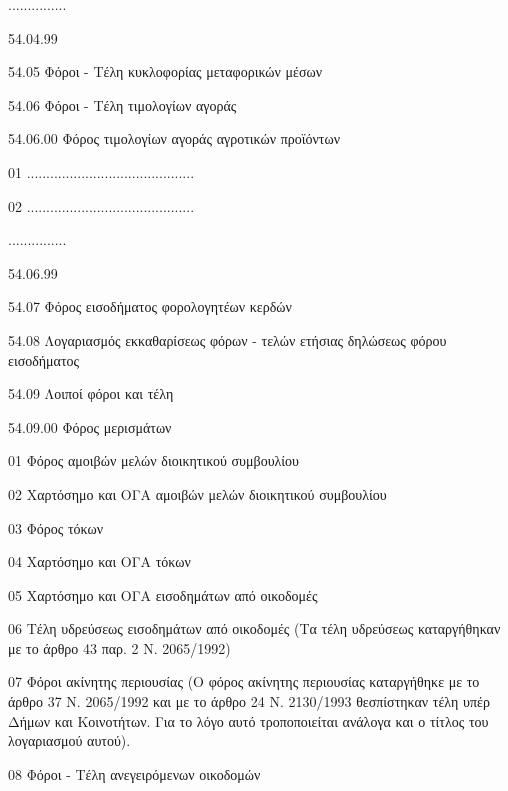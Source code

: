 \documentclass[A4,10pt,greek]{book}
\begin{document}
                      ...............

                      54.04.99

        54.05   Φόροι - Τέλη κυκλοφορίας μεταφορικών μέσων

        54.06   Φόροι - Τέλη τιμολογίων αγοράς

                      54.06.00    Φόρος τιμολογίων αγοράς αγροτικών προϊόντων

                                01   ...........................................

                                02   ...........................................

                      ...............

                      54.06.99

        54.07   Φόρος εισοδήματος φορολογητέων κερδών

        54.08   Λογαριασμός εκκαθαρίσεως φόρων - τελών ετήσιας δηλώσεως φόρου
                     εισοδήματος

        54.09   Λοιποί φόροι και τέλη

                      54.09.00   Φόρος μερισμάτων

                                01   Φόρος αμοιβών μελών διοικητικού συμβουλίου

                                02   Χαρτόσημο και ΟΓΑ αμοιβών μελών διοικητικού συμβουλίου

                                03   Φόρος τόκων

                                04   Χαρτόσημο και ΟΓΑ τόκων

                                05   Χαρτόσημο και ΟΓΑ εισοδημάτων από οικοδομές

                                06   Τέλη υδρεύσεως εισοδημάτων από οικοδομές
                                        (Τα τέλη υδρεύσεως καταργήθηκαν με το άρθρο 43 παρ. 2
                                        Ν. 2065/1992)

                                07   Φόροι ακίνητης περιουσίας (Ο φόρος ακίνητης περιουσίας
                                        καταργήθηκε με το άρθρο 37 Ν. 2065/1992 και με το άρθρο 24
                                        Ν. 2130/1993 θεσπίστηκαν τέλη υπέρ Δήμων και Κοινοτήτων.
                                        Για το λόγο αυτό τροποποιείται ανάλογα και ο τίτλος του
                                        λογαριασμού αυτού).

                                08   Φόροι - Τέλη ανεγειρόμενων οικοδομών
\end{document}
